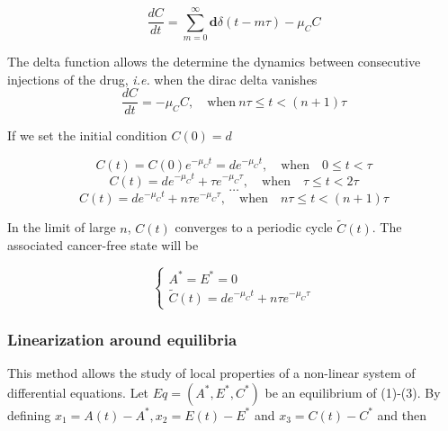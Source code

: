 \[ \frac{dC}{dt} = \sum_{m=0}^\infty \mathbf{d} \delta (t-m\tau) -\mu_C C \]

The delta function allows the determine the dynamics between consecutive injections of the drug, \textit{i.e.} when the dirac delta vanishes
\[ \frac{dC}{dt} = -\mu_C C, \quad \text{when} \ n\tau \leq t < (n+1)\tau  \]

If we set the initial condition $C(0) = d$

\[ C(t) = C(0) e^{-\mu_C t} = d e^{-\mu_C t}, \quad \text{when} \quad 0 \leq t < \tau \]
\[C(t) = d e^{-\mu_C t} + \tau e^{-\mu_C \tau}, \quad \text{when} \quad \tau \leq t < 2\tau \] 
\[\dots\]
\[ C(t) = d e^{-\mu_C t} + n\tau e^{-\mu_C \tau}, \quad \text{when} \quad n\tau \leq t < (n+1)\tau \]

In the limit of large $n$, $C(t)$ converges to a periodic cycle $\tilde{C}(t)$. The associated cancer-free state will be

\[ \begin{cases}
	A^* = E^* = 0 \\ 
	\tilde{C}(t) =  d e^{-\mu_C t} + n\tau e^{-\mu_C \tau} 
\end{cases} \]
\subsubsection{Linearization around equilibria} 
This method allows the study of local properties of a non-linear system of differential equations. Let $Eq = (A^*,E^*,C^*)$ be an equilibrium of (1)-(3). By defining $x_1 = A(t) - A^*, x_2 = E(t) - E^*$ and $x_3 = C(t) - C^*$ and then 
